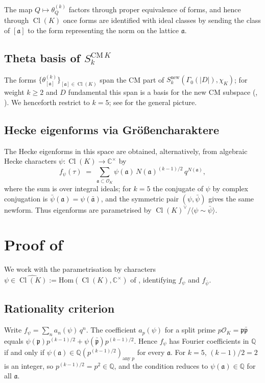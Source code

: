 \documentclass[11pt]{amsart}
\theoremstyle{definition}
\theoremstyle{remark}
\DeclareMathOperator{\Cl}{Cl}
\newcommand{\Q}{\mathbb{Q}}
\newcommand{\C}{\mathbb{C}}
\newcommand{\OK}{\mathcal{O}_K}
\newcommand{\chiK}{\chi_K}
\begin{document}
The map \(Q \mapsto \theta_Q^{(k)}\) factors through proper equivalence
of forms, and hence through \(\Cl(K)\) once forms are identified with
ideal classes by sending the class of \([\mathfrak a]\) to the form
representing the norm on the lattice \(\mathfrak a\).

\subsection{Theta basis of \(S_k^{\mathrm{CM}\,K}\)}
The forms \(\{\theta_{[\mathfrak a]}^{(k)}\}_{[\mathfrak a]\in \Cl(K)}\)
span the CM part of \(S_k^{\mathrm{new}}(\Gamma_0(|D|), \chiK)\); for
weight \(k \ge 2\) and \(D\) fundamental this span is a basis for the
new CM subspace (\cite[Theorem~4.8.2]{Miyake2006}, \cite{Shimura1971}).
We henceforth restrict to \(k=5\); see  for the general
picture.

\subsection{Hecke eigenforms via Gr\"o\ss encharaktere}
The Hecke eigenforms in this space are obtained, alternatively, from
algebraic Hecke characters
\(\psi : \Cl(K) \to \C^\times\) by
\begin{equation}\label{eq:Hecke-theta}
  f_\psi(\tau) \;=\; \sum_{\mathfrak a \subset \OK} \psi(\mathfrak a)\,
  N(\mathfrak a)^{(k-1)/2}\, q^{N(\mathfrak a)} ,
\end{equation}
where the sum is over integral ideals; for \(k=5\) the conjugate of
\(\psi\) by complex conjugation is \(\bar\psi(\mathfrak a) = \psi(\bar{\mathfrak a})\),
and the symmetric pair \((\psi, \bar\psi)\) gives the same newform.
Thus eigenforms are parametrised by \(\Cl(K)^\vee / \langle
\psi \sim \bar\psi \rangle\).

\section{Proof of \texorpdfstring{}{Theorem 1}}\label{sec:proof}

We work with the parametrisation by characters
\(\psi \in \widehat{\Cl(K)} := \mathrm{Hom}(\Cl(K), \C^\times)\) of
, identifying \(f_\psi\) and \(f_{\bar\psi}\).

\subsection{Rationality criterion}
Write \(f_\psi = \sum_n a_n(\psi)\, q^n\). The coefficient \(a_p(\psi)\)
for a split prime \(p\OK = \mathfrak p \bar{\mathfrak p}\) equals
\(\psi(\mathfrak p) p^{(k-1)/2} + \psi(\bar{\mathfrak p}) p^{(k-1)/2}\).
Hence \(f_\psi\) has Fourier coefficients in \(\Q\) if and only if
\(\psi(\mathfrak a) \in \Q(p^{(k-1)/2})_{\mathrm{any}\;p}\) for every
\(\mathfrak a\). For \(k=5\), \((k-1)/2 = 2\) is an integer, so
\(p^{(k-1)/2} = p^2 \in \Q\), and the condition reduces to
\(\psi(\mathfrak a) \in \Q\) for all \(\mathfrak a\).
\end{document}
